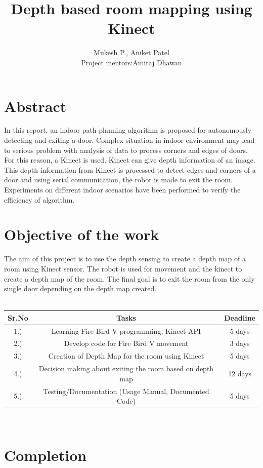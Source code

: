 \documentclass{report}
\author{Mukesh P., Aniket Patel \\ Project mentors:Amiraj Dhawan}
\title{Depth based room mapping using Kinect}
\begin{document}
\maketitle
\tableofcontents


\chapter{Abstract}
In this report, an indoor path planning algorithm is proposed for autonomously detecting and exiting a door. Complex situation in indoor
environment may lead to serious problem with analysis of data to process corners and edges of doors. For this reason, a Kinect is used.
Kinect can give depth information of an image. This depth information from Kinect is processed to detect edges and corners of a door and using serial
communication, the robot is made to exit the room. Experiments on different indoor scenarios have been performed
to verify the efficiency of algorithm.
\chapter{Objective of the work}
The aim of this project is to use the depth sensing to create a depth map of a room using Kinect sensor. The robot is used for movement and the 
kinect to create a depth map of the room. The final goal is to exit the room from the only single door depending on the depth map created. \\ \\

\begin{tabular}{ | c | c | c |}
	\hline\hline
	\bf Sr.No & \bf Tasks & \bf Deadline \\ 
	\hline
	1.) & Learning Fire Bird V programming, Kinect API & 5 days \\
	\hline
	2.) & Develop code for Fire Bird V movement & 3 days \\
	\hline
	3.) & Creation of Depth Map for the room using Kinect & 5 days \\
	\hline
	4.) & Decision making about exiting the room based on depth map & 12 days\\
	\hline
	5.) & Testing/Documentation (Usage Manual, Documented Code) & 5 days
	\\ \hline

\end{tabular} \\

\chapter{Completion}
\end{document}
